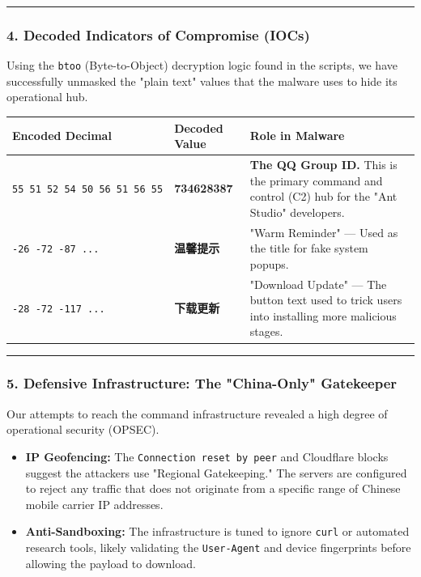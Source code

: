 \documentclass[
]{article}
\begin{document}
\begin{center}\rule{0.5\linewidth}{0.5pt}\end{center}

\subsubsection{4. Decoded Indicators of Compromise
(IOCs)}\label{4-decoded-indicators-of-compromise-iocs}

Using the \texttt{btoo} (Byte-to-Object) decryption logic found in the
scripts, we have successfully unmasked the "plain text" values that the
malware uses to hide its operational hub.

\begin{longtable}[]{@{}lll@{}}
\toprule\noalign{}
Encoded Decimal & Decoded Value & Role in Malware \\
\midrule\noalign{}
\endhead
\bottomrule\noalign{}
\endlastfoot
\texttt{55\ 51\ 52\ 54\ 50\ 56\ 51\ 56\ 55} & \textbf{734628387} &
\textbf{The QQ Group ID.} This is the primary command and control (C2)
hub for the "Ant Studio" developers. \\
\texttt{-26\ -72\ -87\ ...} & \textbf{温馨提示} & "Warm Reminder" ---
Used as the title for fake system popups. \\
\texttt{-28\ -72\ -117\ ...} & \textbf{下载更新} & "Download Update" ---
The button text used to trick users into installing more malicious
stages. \\
\end{longtable}

\begin{center}\rule{0.5\linewidth}{0.5pt}\end{center}

\subsubsection{5. Defensive Infrastructure: The "China-Only"
Gatekeeper}\label{5-defensive-infrastructure-the-china-only-gatekeeper}

Our attempts to reach the command infrastructure revealed a high degree
of operational security (OPSEC).

\begin{itemize}
\item
  \textbf{IP Geofencing:} The \texttt{Connection\ reset\ by\ peer} and
  Cloudflare blocks suggest the attackers use "Regional Gatekeeping."
  The servers are configured to reject any traffic that does not
  originate from a specific range of Chinese mobile carrier IP
  addresses.
\item
  \textbf{Anti-Sandboxing:} The infrastructure is tuned to ignore
  \texttt{curl} or automated research tools, likely validating the
  \texttt{User-Agent} and device fingerprints before allowing the
  payload to download.
\end{itemize}
\end{document}
